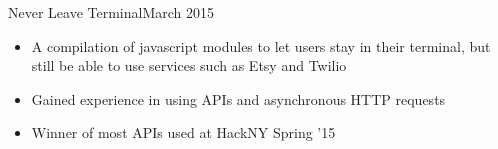 \documentclass[11pt]{article}
\begin{document}
\headedsubsection
{Never Leave Terminal}{March 2015}
{
    \begin{itemize}[leftmargin=0.5in]
        \item{A compilation of javascript modules to let users stay in their terminal, but still be able to use services such as Etsy and Twilio}
        \item{Gained experience in using APIs and asynchronous HTTP requests}
        \item{Winner of most APIs used at HackNY Spring '15}
    \end{itemize}
}
\end{document}
